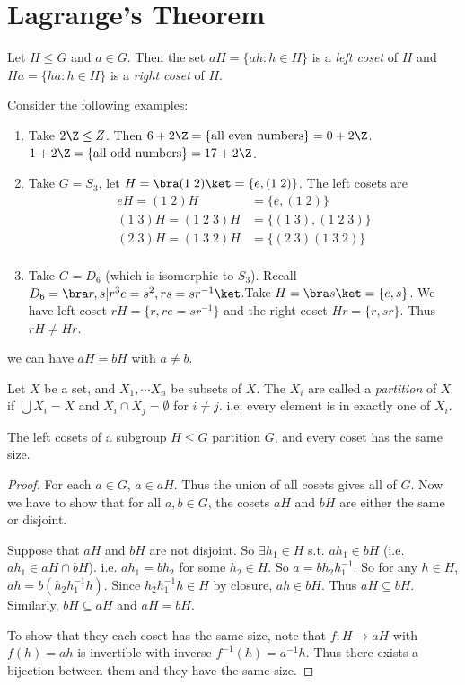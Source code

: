\documentclass[a4pape]{article}
\begin{document}
\section{Lagrange's Theorem}
\begin{defi}[Cosets]
  Let $H\leq G$ and $a\in G$. Then the set $aH =\{ah : h\in H\}$ is a \emph{left coset} of $H$  and $Ha = \{ha : h\in H\}$ is a \emph{right coset} of $H$.
\end{defi}
\begin{eg}
  Consider the following examples: 
  \begin{enumerate}
    \item Take $2\Z \leq Z$. Then $6 + 2\Z = \{\text{all even numbers}\} = 0 + 2\Z$. $1 + 2\Z = \{\text{all odd numbers}\} = 17 + 2\Z$. 
    \item Take $G = S_3$, let $H = \bra (1\; 2)\ket = \{e, (1\; 2)\}$. The left cosets are 
      \begin{align*}
        eH = (1\; 2)H &= \{e, (1\; 2)\}\\
        (1\; 3)H = (1\; 2\; 3)H &= \{(1\; 3), (1\; 2\; 3)\}\\
        (2\; 3)H = (1\; 3\; 2)H &= \{(2\; 3)(1\; 3\; 2)\}\\
      \end{align*}
    \item Take $G = D_6$ (which is isomorphic to $S_3$). Recall $D_6 = \bra r, s | r^3 e = s^2, rs = sr^{-1}\ket$.Take $H = \bra s\ket = \{e, s\}$. We have left coset $rH = \{r, re = sr^{-1}\}$ and the right coset $Hr = \{r, sr\}$. Thus $rH \not= Hr$. 
  \end{enumerate}
\end{eg}
\note we can have $aH = bH$ with $a\not= b$. 

\begin{defi}[Partition]
  Let $X$ be a set, and $X_1, \cdots X_n$ be subsets of $X$. The $X_i$ are called a \emph{partition} of $X$ if $\bigcup X_i = X$ and $X_i\cap X_j = \emptyset$ for $i\not= j$. i.e. every element is in exactly one of $X_i$.
\end{defi}

\begin{lemma}
  The left cosets of a subgroup $H\leq G$ partition $G$, and every coset has the same size.
\end{lemma}

\begin{proof}
  For each $a\in G$, $a\in aH$. Thus the union of all cosets gives all of $G$. Now we have to show that for all $a, b\in G$, the cosets $aH$ and $bH$ are either the same or disjoint.

  Suppose that $aH$ and $bH$ are not disjoint. So $\exists h_1\in H$ s.t. $ah_1\in bH$ (i.e. $ah_1\in aH\cap bH$). i.e. $ah_1 = bh_2$ for some $h_2\in H$. So $a = bh_2h_1^{-1}$. So for any $h\in H$, $ah = b(h_2h_1^{-1}h)$. Since $h_2h_1^{-1}h\in H$ by closure, $ah\in bH$. Thus $aH\subseteq bH$. Similarly, $bH\subseteq aH$ and $aH = bH$.

  To show that they each coset has the same size, note that $f: H \to aH$ with $f(h) = ah$ is invertible with inverse $f^{-1}(h) = a^{-1}h$. Thus there exists a bijection between them and they have the same size.
\end{proof}
\end{document}
